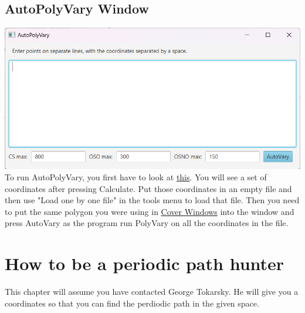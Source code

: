 \documentclass[11pt]{report}
\begin{document}
\section{AutoPolyVary Window}\label{AutoPolyVary}
\includegraphics[scale=0.75]{Autopolyvary}
To run AutoPolyVary, you first have to look at \hyperref[covers]{this}. 
You will see a set of coordinates after pressing Calculate. 
Put those coordinates in an empty file and then use "Load one by one file" in the tools menu to load that file. 
Then you need to put the same polygon you were using in \hyperref[cover_window]{Cover Windows} into the window and press AutoVary as the program run PolyVary on all the coordinates in the file.

\chapter{How to be a periodic path hunter}
This chapter will assume you have contacted George Tokarsky. He will give you a coordinates so that 
you can find the perdiodic path in the given space.
\end{document}
